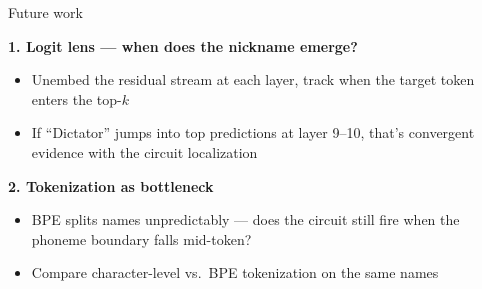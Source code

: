 \documentclass[10pt,aspectratio=169]{beamer}
\begin{document}
\begin{frame}
\begin{center}
\vfill
  {\setlength{\fboxrule}{2.5pt}}
\vfill
\end{center}
\end{frame}

\begin{frame}{Future work}
\hypertarget{sl:tokenization}{}

\textbf{1. Logit lens --- when does the nickname emerge?}
\begin{itemize}
  \item Unembed the residual stream at each layer, track when the target token enters the top-$k$
  \item If ``Dictator'' jumps into top predictions at layer 9--10, that's convergent evidence with the circuit localization
\end{itemize}

\vspace{0.5em}
\textbf{2. Tokenization as bottleneck}

\begin{minipage}{0.55\textwidth}
\begin{itemize}
  \item BPE splits names unpredictably --- does the circuit still fire when the phoneme boundary falls mid-token?
  \item Compare character-level vs.\ BPE tokenization on the same names
\end{itemize}
\end{minipage}%
\hfill
\begin{minipage}{0.38\textwidth}
\begin{center}
\end{center}
\end{minipage}


\end{frame}
\end{document}
